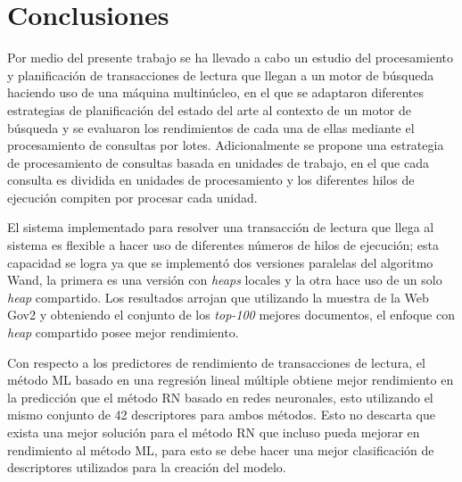 \chapter{Conclusiones}
\label{cap:conclu}

Por medio del presente trabajo se ha llevado a cabo un estudio del procesamiento y planificación de transacciones de lectura que llegan a un motor de búsqueda haciendo uso de una máquina multinúcleo, en el que se adaptaron diferentes estrategias de planificación del estado del arte al contexto de un motor de búsqueda y se evaluaron los rendimientos de cada una de ellas mediante el procesamiento de consultas por lotes. Adicionalmente se propone una estrategia de procesamiento de consultas basada en unidades de trabajo, en el que cada consulta es dividida en unidades de procesamiento y los diferentes hilos de ejecución compiten por procesar cada unidad.

El sistema implementado para resolver una transacción de lectura que llega al sistema es flexible a hacer uso de diferentes números de hilos de ejecución; esta capacidad se logra ya que se implementó dos versiones paralelas del algoritmo Wand, la primera es una versión con \textit{heaps} locales y la otra hace uso de un solo \textit{heap} compartido. Los resultados arrojan que utilizando la muestra de la Web Gov2 y obteniendo el conjunto de los \textit{top-100} mejores documentos, el enfoque con \textit{heap} compartido posee mejor rendimiento. 

Con respecto a los predictores de rendimiento de transacciones de lectura, el método ML basado en una regresión lineal múltiple obtiene mejor rendimiento en la predicción que el método RN basado en redes neuronales, esto utilizando el mismo conjunto de 42 descriptores para ambos métodos. Esto no descarta que exista una mejor solución para el método RN que incluso pueda mejorar en rendimiento al método ML, para esto se debe hacer una mejor clasificación de descriptores utilizados para la creación del modelo.
 














